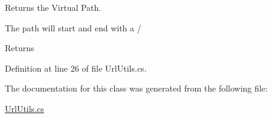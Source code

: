Returns the Virtual Path. 

The path will start and end with a /

\begin{DoxyReturn}{Returns}

\end{DoxyReturn}


Definition at line 26 of file Url\+Utils.\+cs.



The documentation for this class was generated from the following file\+:\begin{DoxyCompactItemize}
\item 
\mbox{\hyperlink{UrlUtils_8cs}{Url\+Utils.\+cs}}\end{DoxyCompactItemize}
